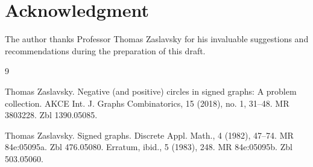 \documentclass[12pt]{amsart}
\theoremstyle{theorem}%
\theoremstyle{definition}%
\begin{document}
\newpage

\section{Acknowledgment}

The author thanks Professor Thomas Zaslavsky for his invaluable suggestions and recommendations during the preparation of this draft.




\begin{thebibliography}{9}


  Thomas Zaslavsky. Negative (and positive) circles in signed graphs: A problem collection.  AKCE Int. J. Graphs Combinatorics, 15 (2018), no. 1, 31--48. MR 3803228. Zbl 1390.05085.

 Thomas Zaslavsky. Signed graphs. Discrete Appl. Math., 4 (1982), 47--74. MR 84e:05095a. Zbl 476.05080. Erratum, ibid., 5 (1983), 248. MR 84e:05095b. Zbl 503.05060.
\end{thebibliography}
\end{document}
